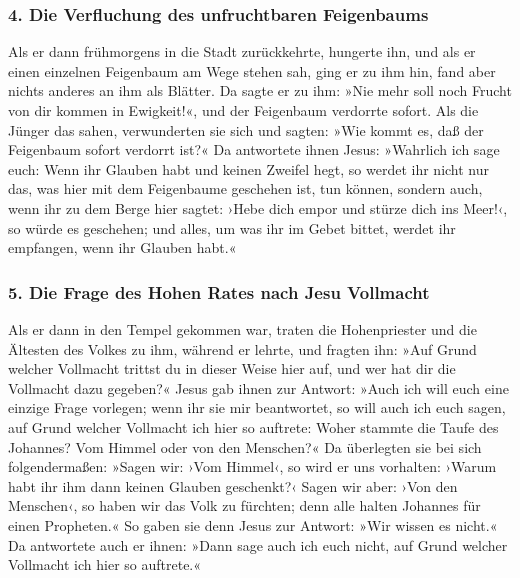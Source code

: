 \hypertarget{die-verfluchung-des-unfruchtbaren-feigenbaums}{%
\subsubsection{4. Die Verfluchung des unfruchtbaren
Feigenbaums}\label{die-verfluchung-des-unfruchtbaren-feigenbaums}}

 Als er dann frühmorgens in die Stadt zurückkehrte,
hungerte ihn,  und als er einen einzelnen Feigenbaum am
Wege stehen sah, ging er zu ihm hin, fand aber nichts anderes an ihm als
Blätter. Da sagte er zu ihm: »Nie mehr soll noch Frucht von dir kommen
in Ewigkeit!«, und der Feigenbaum verdorrte sofort.  Als
die Jünger das sahen, verwunderten sie sich und sagten: »Wie kommt es,
daß der Feigenbaum sofort verdorrt ist?«  Da antwortete
ihnen Jesus: »Wahrlich ich sage euch: Wenn ihr Glauben habt und keinen
Zweifel hegt, so werdet ihr nicht nur das, was hier mit dem Feigenbaume
geschehen ist, tun können, sondern auch, wenn ihr zu dem Berge hier
sagtet: ›Hebe dich empor und stürze dich ins Meer!‹, so würde es
geschehen;  und alles, um was ihr im Gebet bittet, werdet
ihr empfangen, wenn ihr Glauben habt.«

\hypertarget{die-frage-des-hohen-rates-nach-jesu-vollmacht}{%
\subsubsection{5. Die Frage des Hohen Rates nach Jesu
Vollmacht}\label{die-frage-des-hohen-rates-nach-jesu-vollmacht}}

 Als er dann in den Tempel gekommen war, traten die
Hohenpriester und die Ältesten des Volkes zu ihm, während er lehrte, und
fragten ihn: »Auf Grund welcher Vollmacht trittst du in dieser Weise
hier auf, und wer hat dir die Vollmacht dazu gegeben?« 
Jesus gab ihnen zur Antwort: »Auch ich will euch eine einzige Frage
vorlegen; wenn ihr sie mir beantwortet, so will auch ich euch sagen, auf
Grund welcher Vollmacht ich hier so auftrete:  Woher
stammte die Taufe des Johannes? Vom Himmel oder von den Menschen?« Da
überlegten sie bei sich folgendermaßen:  »Sagen wir: ›Vom
Himmel‹, so wird er uns vorhalten: ›Warum habt ihr ihm dann keinen
Glauben geschenkt?‹ Sagen wir aber: ›Von den Menschen‹, so haben wir das
Volk zu fürchten; denn alle halten Johannes für einen Propheten.«
 So gaben sie denn Jesus zur Antwort: »Wir wissen es
nicht.« Da antwortete auch er ihnen: »Dann sage auch ich euch nicht, auf
Grund welcher Vollmacht ich hier so auftrete.«

